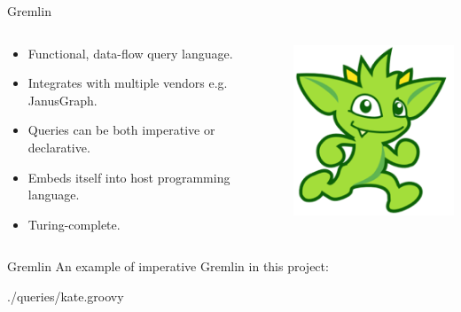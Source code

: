 \begin{frame}{Gremlin}
    \begin{columns}
        \begin{column}{.6\textwidth}
            \begin{itemize}
                \item Functional, data-flow query language.
                \item Integrates with multiple vendors e.g. JanusGraph.
                \item Queries can be both imperative or declarative.
                \item Embeds itself into host programming language.
                \item Turing-complete.
            \end{itemize}
            \end{column}%
            \hfill%
            \begin{column}{.39\textwidth}
            \centering
            \includegraphics[width=0.7\columnwidth]{img/graph-lang/gremlin-running.png}
        \end{column}%
    \end{columns}
\end{frame}

\begin{frame}{Gremlin}
    An example of imperative Gremlin in this project:
    
    {./queries/kate.groovy}
\end{frame}

